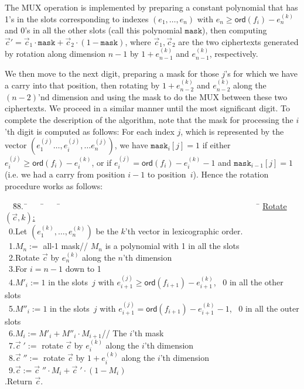 \documentclass[14pt]{extarticle}
\def\ord{\mathsf{ord}}
\def\vc{\vec{c}}
\begin{document}
\begin{description}
The MUX operation is implemented by preparing a constant polynomial
that has 1's in the slots corresponding to indexes $(e_1,\ldots,e_n)$
with $e_n\ge\ord(f_i)-e^{(k)}_n$ and 0's in all the other slots
(call this polynomial $\mathtt{mask}$), then computing $\vc'=\vc_1
\cdot\mathtt{mask} + \vc_2\cdot(1-\mathtt{mask})$, where $\vc_1,\vc_2$
are the two ciphertexts generated by rotation along dimension $n-1$ by
$1+e^{(k)}_{n-1}$ and $e^{(k)}_{n-1}$, respectively.

We then move to the next digit, preparing a mask for those $j$'s for
which we have a carry into that position, then rotating by $1+
e^{(k)}_{n-2}$ and $e^{(k)}_{n-2}$ along the $(n-2)$'nd dimension and
using the mask to do the MUX between these two ciphertexts. We proceed
in a similar manner until the most significant digit. To complete the
description of the algorithm, note that the mask for processing the
$i$'th digit is computed as follows: For each index $j$, which is
represented by the vector $(e^{(j)}_1\ldots,e^{(j)}_i,\ldots
e^{(j)}_n)$, we have $\mathtt{mask}_i[j]=1$ if either $e^{(j)}_i\ge
\ord(f_i)-e^{(k)}_i$, or if $e^{(j)}_i=\ord(f_i)-e^{(k)}_i-1$ and
$\mathtt{mask}_{i-1}[j]=1$ (i.e. we had a carry from position $i-1$
to position~$i$). Hence the rotation procedure works as follows:

\begin{tabbing}
~~\=88.~\=~~~~\=~~~~\=
~~~~~~~~~~~~~~~~~~~~~~~~~~~~~~~~~~~~~~~~~~~~~~~~\=\kill
\underline{Rotate$(\vc,k)$:}\\
\>~0.\>Let $(e^{(k)}_1,\ldots,e^{(k)}_n)$ be the $k$'th vector in
  lexicographic order.\\
\>~1.\>$M_n:=$ all-1 mask\>\>\>// $M_n$ is a polynomial with 1 in all the slots\\
\>~2.\>Rotate $\vc$ by $e^{(k)}_n$ along the $n$'th dimension\\
\>~3.\>For $i=n-1$ down to 1\\
\>~4.\>\>$M'_i:=1$ in the slots~$j$ with
         $e^{(j)}_{i+1}\ge\ord(f_{i+1})-e^{(k)}_{i+1}$,~
         0 in all the other slots\\
\>~5.\>\>$M''_i:=1$ in the slots~$j$ with
         $e^{(j)}_{i+1}=\ord(f_{i+1})-e^{(k)}_{i+1}-1$,~
         0 in all the outer slots\\
\>~6.\>\>$M_i:= M'_i + M''_i \cdot M_{i+1}$\>\>// The $i$'th mask\\
\>~7.\>\>$\vc\;':=$ rotate $\vc$ by $e^{(k)}_i$ along the $i$'th dimension\\
\>~8.\>\>$\vc\;'':=$ rotate $\vc$ by $1+e^{(k)}_i$ along the $i$'th dimension\\
\>~9.\>\>$\vc:=\vc\;'' \cdot M_i + \vc\;'\cdot(1-M_i)$\\
.\>Return $\vc$.
\end{tabbing}


\end{description}
\end{document}
